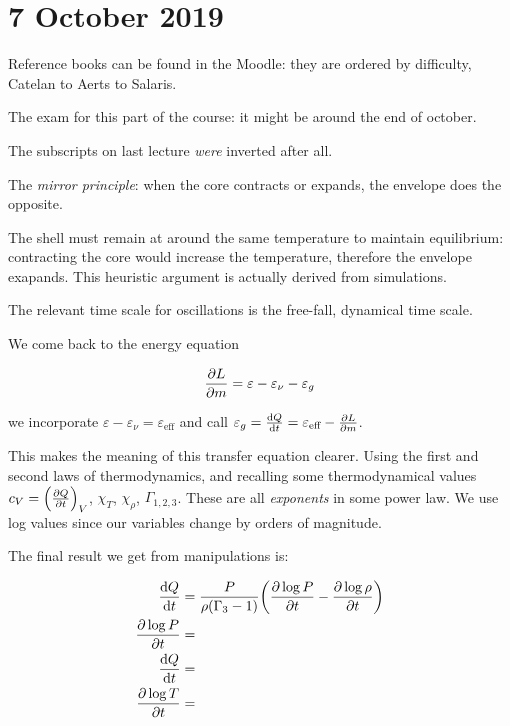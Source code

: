 \documentclass[main.tex]{subfiles}
\begin{document}
\section*{7 October 2019}

Reference books can be found in the Moodle:
they are ordered by difficulty, Catelan to Aerts to Salaris.

The exam for this part of the course: it might be around the end of october.

The subscripts on last lecture \emph{were} inverted after all.

The \emph{mirror principle}: when the core contracts or expands, the envelope does the opposite.

The shell must remain at around the same temperature to maintain equilibrium: contracting the core would increase the temperature, therefore the envelope exapands.
This heuristic argument is actually derived from simulations.

The relevant time scale for oscillations is the free-fall, dynamical time scale.

We come back to the energy equation

\begin{equation}
  \pdv{L}{m} = \varepsilon - \varepsilon_\nu - \varepsilon_g
\end{equation}

we incorporate \(\varepsilon - \varepsilon_\nu = \varepsilon_{\text{eff}} \) and call \( \varepsilon_g = \dv{Q}{t} = \varepsilon_{\text{eff}} - \pdv{L}{m}\).

This makes the meaning of this transfer equation clearer.
Using the first and second laws of thermodynamics, and recalling some thermodynamical values \(c_V = \qty(\pdv{Q}{t})_V \), \(\chi_T \), \(\chi_\rho
\), \(\Gamma_{1,2,3}\).
These are all \emph{exponents} in some power law.
We use log values since our variables change by orders of magnitude.

The final result we get from manipulations is:

\begin{subequations}
\begin{align}
  \dv{Q}{t}  &= \frac{P}{\rho (\Gamma_3 -1)} \qty(\pdv{\log P }{t} - \pdv{\log \rho}{t}  )  \\
  \pdv{\log P }{t} &=  \\
  \dv{Q}{t} &=  \\
  \pdv{\log T }{t} &=
\end{align}
\end{subequations}
\end{document}
